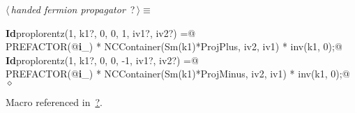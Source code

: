 \documentclass[a4paper,12pt]{amsart}
\renewcommand{\NWtarget}[2]{\hypertarget{#1}{#2}}
\renewcommand{\NWlink}[2]{\hyperlink{#1}{#2}}
\renewcommand{\NWtxtMacroRefIn}{Macro referenced in}
\renewcommand{\NWsep}{${\diamond}$}
\begin{document}
\begin{flushleft} \small
\begin{minipage}{\linewidth}\label{scrap7}\raggedright\small
\NWtarget{nuweb?}{} $\langle\,${\it handed fermion propagator}\nobreak\ {\footnotesize {?}}$\,\rangle\equiv$
\vspace{-1ex}
\begin{list}{}{} \item
\mbox{}\verb@@\hbox{\sffamily\bfseries Id}\verb@ proplorentz(1, k1?, 0, 0, 1, iv1?, iv2?) =@\\
\mbox{}\verb@  PREFACTOR(@\hbox{\sffamily\bfseries i}\verb@_) * NCContainer(Sm(k1)*ProjPlus, iv2, iv1) * inv(k1, 0);@\\
\mbox{}\verb@@\hbox{\sffamily\bfseries Id}\verb@ proplorentz(1, k1?, 0, 0, -1, iv1?, iv2?) =@\\
\mbox{}\verb@  PREFACTOR(@\hbox{\sffamily\bfseries i}\verb@_) * NCContainer(Sm(k1)*ProjMinus, iv2, iv1) * inv(k1, 0);@{\NWsep}
\end{list}
\vspace{-1.5ex}
\footnotesize
\begin{list}{}{\setlength{\itemsep}{-\parsep}\setlength{\itemindent}{-\leftmargin}}
\item \NWtxtMacroRefIn\ \NWlink{nuweb?}{?}.

\item{}
\end{list}
\end{minipage}\vspace{4ex}
\end{flushleft}
\end{document}
